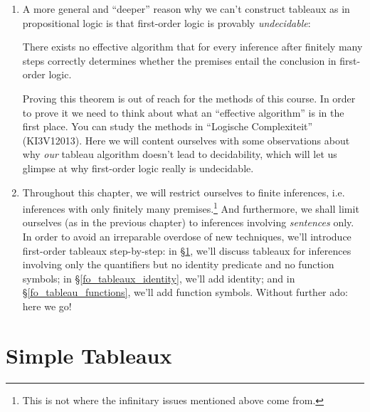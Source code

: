 \begin{enumerate}[\thesection.1]
		\item A more general and ``deeper'' reason why we can't construct tableaux as in propositional logic is that first-order logic is provably \emph{undecidable}:
		
		\begin{theorem} There exists no effective algorithm that for every inference after finitely many steps correctly determines whether the premises entail the conclusion in first-order logic.
		\end{theorem}
Proving this theorem is out of reach for the methods of this course. In order to prove it we need to think about what an ``effective algorithm'' is in the first place. You can study the methods in ``Logische Complexiteit'' (KI3V12013). Here we will content ourselves with some observations about why \emph{our} tableau algorithm doesn't lead to decidability, which will let us glimpse at why first-order logic really is undecidable.

	\item Throughout this chapter, we will restrict ourselves to finite inferences, i.e. inferences with only finitely many premises.\footnote{This is not where the infinitary issues mentioned above come from.} And furthermore, we shall limit ourselves (as in the previous chapter) to inferences involving \emph{sentences} only. In order to avoid an irreparable overdose of new techniques, we'll introduce first-order tableaux step-by-step: in \S\ref{fo_tableaux_simple}, we'll discuss tableaux for inferences involving only the quantifiers but no identity predicate and no function symbols; in \S\ref{fo_tableaux_identity}, we'll add identity; and in \S\ref{fo_tableau_functions}, we'll add function symbols. Without further ado: here we go!
				
	\end{enumerate}

\section{Simple Tableaux}
\label{fo_tableaux_simple}

